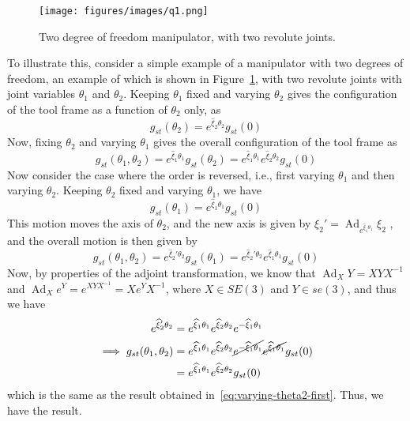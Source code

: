 \newpage
\begin{figure}[htb]
    \centering
    \texttt{[image: figures/images/q1.png]}
    \caption{
        Two degree of freedom manipulator, with two revolute joints.
    }\label{fig:2dof-manipulator}
\end{figure}

To illustrate this, consider a simple example of a manipulator with two degrees of freedom, an example of which is shown in Figure~\ref{fig:2dof-manipulator}, with two revolute joints with joint variables \( \theta_1 \) and \( \theta_2 \).
Keeping \( \theta_1 \) fixed and varying \( \theta_2 \) gives the configuration of the tool frame as a function of \( \theta_2 \) only, as
\begin{equation*}
    g_{st}(\theta_2)
    =
    e^{\widehat{\xi}_2 \theta_2}
    g_{st}(0)
\end{equation*}
Now, fixing \( \theta_2 \) and varying \( \theta_1 \) gives the overall configuration of the tool frame as
\begin{equation}\label{eq:varying-theta2-first}
    g_{st}(\theta_1, \theta_2)
    =
    e^{\widehat{\xi}_1 \theta_1}
    g_{st}(\theta_2)
    =
    e^{\widehat{\xi}_1 \theta_1}
    e^{\widehat{\xi}_2 \theta_2}
    g_{st}(0)
\end{equation}
Now consider the case where the order is reversed, i.e., first varying \( \theta_1 \) and then varying \( \theta_2 \).
Keeping \( \theta_2 \) fixed and varying \( \theta_1 \), we have
\begin{equation*}
    g_{st}(\theta_1)
    =
    e^{\widehat{\xi}_1 \theta_1}
    g_{st}(0)
\end{equation*}
This motion moves the axis of \( \theta_2 \), and the new axis is given by
\(
\displaystyle
\xi_2'
=
\operatorname{Ad}_{e^{\widehat{\xi}_1 \theta_1}} \xi_2
\)
, and the overall motion is then given by
\begin{equation*}
    g_{st}(\theta_1, \theta_2)
    =
    e^{\widehat{\xi}_2' \theta_2}
    g_{st}(\theta_1)
    =
    e^{\widehat{\xi}_2' \theta_2}
    e^{\widehat{\xi}_1 \theta_1}
    g_{st}(0)
\end{equation*}
Now, by properties of the adjoint transformation, we know that \( \operatorname{Ad}_X Y = X Y X^{-1} \) and \( \operatorname{Ad}_X e^Y = e^{X Y X^{-1}} = X e^Y X^{-1} \), where \( X \in SE (3) \) and \( Y \in se (3) \), and thus we have
\begin{align*}
    e^{\widehat{\xi}_2' \theta_2}
     & =
    e^{\widehat{\xi}_1 \theta_1}
    e^{\widehat{\xi}_2 \theta_2}
    e^{-\widehat{\xi}_1 \theta_1}
    \\
    \implies
    g_{st}(\theta_1, \theta_2)
     & =
    e^{\widehat{\xi}_1 \theta_1}
    e^{\widehat{\xi}_2 \theta_2}
    \cancel{e^{-\widehat{\xi}_1 \theta_1}}
    \cancel{e^{\widehat{\xi}_1 \theta_1}}
    g_{st}(0)
    \nonumber
    \\ & =
    e^{\widehat{\xi}_1 \theta_1}
    e^{\widehat{\xi}_2 \theta_2}
    g_{st}(0)
\end{align*}
which is the same as the result obtained in~\eqref{eq:varying-theta2-first}.
Thus, we have the result.
